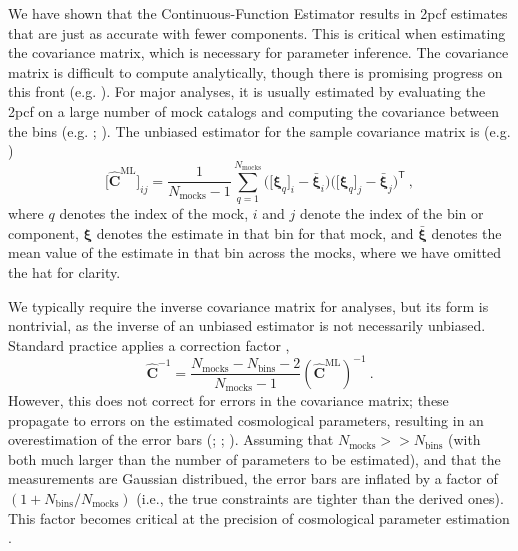 \documentclass[modern]{aastex62}
\newcommand{\cf}{2pcf\xspace} %
\newcommand{\est}{the Continuous-Function Estimator\xspace}
\newcommand{\inv}{^{-1}}
\newcommand{\T}{^{\mathsf{T}}}
\newcommand{\bld}[1]{\bm{#1}} %
\newcommand{\NN}[1]{N_\mathrm{#1}}
\begin{document}
We have shown that \est results in \cf estimates that are just as accurate with fewer components.
This is critical when estimating the covariance matrix, which is necessary for parameter inference.
The covariance matrix is difficult to compute analytically, though there is promising progress on this front (e.g. \citealt{Wadekar2020}).
For major analyses, it is usually estimated by evaluating the \cf on a large number of mock catalogs and computing the covariance between the bins (e.g. \citealt{Reid2010}; \citealt{Anderson2014}).
The unbiased estimator for the sample covariance matrix is (e.g. \citealt{Anderson2003})
\begin{equation}
\big[ \bld{\hat{C}}^\mathrm{ML} \big]_{ij} = \frac{1}{\NN{mocks}-1} \sum_{q=1}^{\NN{mocks}} \bigg( \big[\bld{\xi}_q \big]_i - \bar{\bld{\xi}}_i \bigg) \bigg([\bld{\xi}_q \big]_j - \bar{\bld{\xi}}_j \bigg)\T ~,
\end{equation}
where $q$ denotes the index of the mock, $i$ and $j$ denote the index of the bin or component, $\bld{\xi}$ denotes the estimate in that bin for that mock, and $\bar{\bld{\xi}}$ denotes the mean value of the estimate in that bin across the mocks, where we have omitted the hat for clarity.

We typically require the inverse covariance matrix for analyses, but its form is nontrivial, as the inverse of an unbiased estimator is not necessarily unbiased.
Standard practice applies a correction factor \citep{Hartlap2007},
\begin{equation}
\bld{\hat{C}}\inv = \frac{\NN{mocks}-\NN{bins}-2}{\NN{mocks}-1} \left( \bld{\hat{C}}^\mathrm{ML} \right) \inv ~.
\end{equation}
However, this does not correct for errors in the covariance matrix; these propagate to errors on the estimated cosmological parameters, resulting in an overestimation of the error bars (\citealt{Hartlap2007}; \citealt{Dodelson2013} \citealt{Percival2014}; \citealt{TaylorJoachimi2014}).
Assuming that $\NN{mocks} >> \NN{bins}$ (with both much larger than the number of parameters to be estimated), and that the measurements are Gaussian distribued, the error bars are inflated by a factor of $(1 + \NN{bins}/\NN{mocks})$ (i.e., the true constraints are tighter than the derived ones).
This factor becomes critical at the precision of cosmological parameter estimation \citep{Percival2014}.
\end{document}
